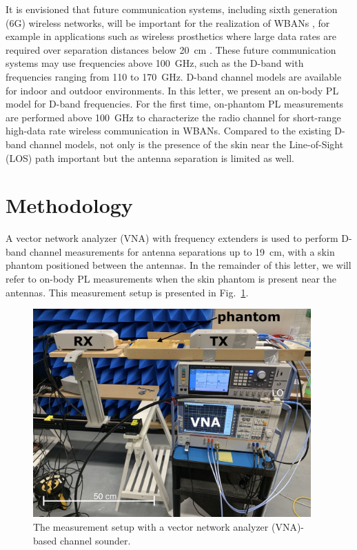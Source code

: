 \documentclass[manuscript]{rsl}
\begin{document}
It is envisioned that future communication systems, including sixth generation (6G) wireless networks, will be important for the realization of WBANs \cite{Cornet2022}, for example in applications such as wireless prosthetics where large data rates are required over separation distances below 20~cm \cite{Proesmans2022}.
These future communication systems may use frequencies above 100~GHz, such as the D-band with frequencies ranging from 110 to 170~GHz.
D-band channel models are available for indoor \cite{DeBeelde2021_access, Pometcu2020} and outdoor \cite{DeBeelde2022_tap,DeBeelde2022_wcl} environments. 
In this letter, we present an on-body PL model for D-band frequencies. 
For the first time, on-phantom PL measurements are performed above 100~GHz to characterize the radio channel for short-range high-data rate wireless communication in WBANs.
Compared to the existing D-band channel models, not only is the presence of the skin near the Line-of-Sight (LOS) path important but the antenna separation is limited as well. 


\section{Methodology \label{sect:method}}

A vector network analyzer (VNA) with frequency extenders is used to perform D-band channel measurements for antenna separations up to 19~cm, with a skin phantom positioned between the antennas.
In the remainder of this letter, we will refer to on-body PL measurements when the skin phantom is present near the antennas. 
This measurement setup is presented in Fig.~\ref{fig:sounder_setup}.
\begin{figure}[tb]
\begin{center}
	\includegraphics[width=0.95\textwidth]{figures/measurement_setup}
\caption{The measurement setup with a vector network analyzer (VNA)-based channel sounder.}
\label{fig:sounder_setup}
\end{center}
\end{figure}
\end{document}
